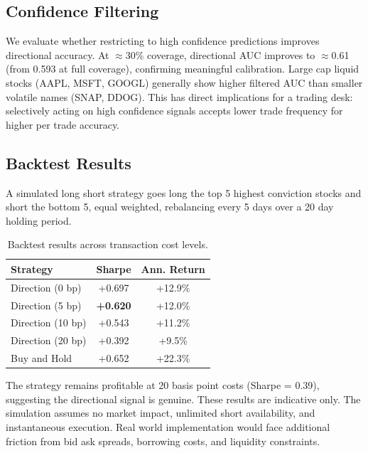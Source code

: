 \documentclass[10pt, twocolumn, a4paper]{article}
\begin{document}
\subsection{Confidence Filtering}

We evaluate whether restricting to high confidence predictions improves
directional accuracy. At $\approx$30\% coverage, directional AUC improves
to $\approx$0.61 (from 0.593 at full coverage), confirming meaningful
calibration. Large cap liquid stocks (AAPL, MSFT, GOOGL) generally show
higher filtered AUC than smaller volatile names (SNAP, DDOG). This has
direct implications for a trading desk: selectively acting on
high confidence signals accepts lower trade frequency for higher per trade
accuracy.

\subsection{Backtest Results}

A simulated long short strategy goes long the top 5 highest conviction
stocks and short the bottom 5, equal weighted, rebalancing every 5 days
over a 20 day holding period.

\begin{table}[H]
\centering
\small
\caption{Backtest results across transaction cost levels.}
\label{tab:backtest}
\begin{tabular}{lcc}
\toprule
\textbf{Strategy} & \textbf{Sharpe} & \textbf{Ann. Return} \\
\midrule
Direction (0 bp)   & +0.697  & +12.9\% \\
Direction (5 bp)   & \textbf{+0.620}  & +12.0\% \\
Direction (10 bp)  & +0.543  & +11.2\% \\
Direction (20 bp)  & +0.392  & +9.5\%  \\
Buy and Hold       & +0.652  & +22.3\% \\
\bottomrule
\end{tabular}
\end{table}

The strategy remains profitable at 20 basis point costs (Sharpe = 0.39),
suggesting the directional signal is genuine. These results are indicative
only. The simulation assumes no market impact, unlimited short availability,
and instantaneous execution. Real world implementation would face additional
friction from bid ask spreads, borrowing costs, and liquidity constraints.


\end{document}
